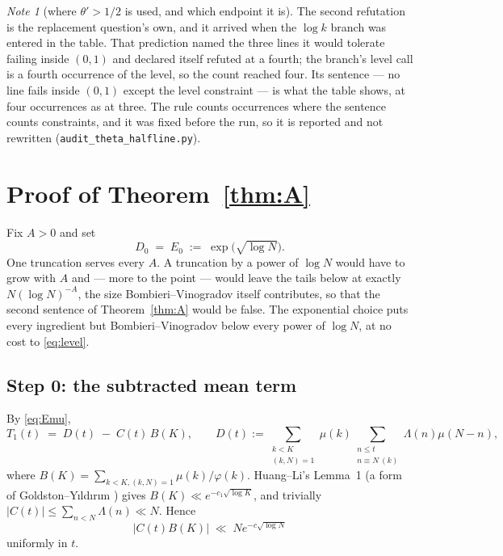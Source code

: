 \documentclass[11pt,a4paper]{article}
\theoremstyle{plain}
\theoremstyle{definition}
\theoremstyle{remark}
\newtheorem{note}[theorem]{Note}
\begin{document}
\begin{note}[where \texorpdfstring{$\theta'>1/2$}{the exponent
condition} is used, and which endpoint it
is]
The second refutation is the replacement question's own, and it arrived
when the $\log k$ branch was entered in the table. That prediction
named the three lines it would tolerate failing inside $(0,1)$ and
declared itself refuted at a fourth; the branch's level call is a
fourth occurrence of the level, so the count reached four. Its
sentence --- no line fails inside $(0,1)$ except the level constraint
--- is what the table shows, at four occurrences as at three. The rule
counts occurrences where the sentence counts constraints, and it was
fixed before the run, so it is reported and not rewritten
(\texttt{audit\_theta\_halfline.py}).
\end{note}

\section{Proof of \texorpdfstring{Theorem~\ref{thm:A}}{the first theorem}}
\label{sec:proof}

Fix $A>0$ and set
\begin{equation}\label{eq:trunc}
  D_0\;=\;E_0\;:=\;\exp\bigl(\sqrt{\log N}\bigr).
\end{equation}
One truncation serves every $A$. A truncation by a power of $\log N$
would have to grow with $A$ and --- more to the point --- would leave
the tails below at exactly $N(\log N)^{-A}$, the size
Bombieri--Vinogradov itself contributes, so that the second sentence of
Theorem~\ref{thm:A} would be false. The exponential choice puts every
ingredient but Bombieri--Vinogradov below every power of $\log N$, at
no cost to \eqref{eq:level}.

\subsection{Step 0: the subtracted mean term}

By \eqref{eq:Emu},
\begin{equation}\label{eq:split0}
  T_1(t)\;=\;D(t)\;-\;C(t)\,B(K),
  \qquad
  D(t):=\sum_{\substack{k<K\\(k,N)=1}}\mu(k)
        \sum_{\substack{n\le t\\ n\equiv N\ (k)}}\Lambda(n)\mu(N-n),
\end{equation}
where $B(K)=\sum_{k<K,(k,N)=1}\mu(k)/\varphi(k)$. Huang--Li's Lemma~1
(a form of Goldston--Y{\i}ld{\i}r{\i}m \cite{GY}) gives
$B(K)\ll e^{-c_1\sqrt{\log K}}$, and trivially
$|C(t)|\le\sum_{n<N}\Lambda(n)\ll N$. Hence
\begin{equation}\label{eq:meanterm}
  |C(t)B(K)|\;\ll\;Ne^{-c\sqrt{\log N}}
\end{equation}
uniformly in $t$.
\end{document}
